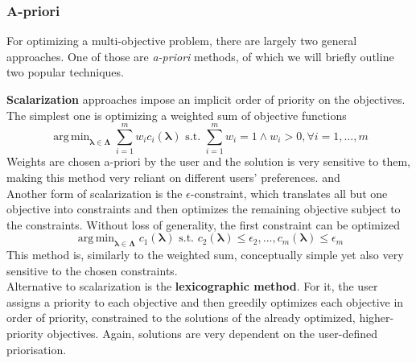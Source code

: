 \documentclass[twoside,11pt]{article}
\DeclareMathOperator*{\argmin}{arg\,min}
\begin{document}
\subsubsection{A-priori}
For optimizing a multi-objective problem, there are largely two general approaches.
One of those are \textit{a-priori} methods, of which we will briefly outline two popular techniques.

\textbf{Scalarization} approaches impose an implicit order of priority on the objectives.
The simplest one is optimizing a weighted sum of objective functions
\begin{equation}
  \argmin_{\boldsymbol\lambda\in\boldsymbol\Lambda} \sum_{i=1}^m w_i c_i(\boldsymbol\lambda)
  \text{ s.t. } \sum_{i=1}^m w_i=1 \wedge w_i>0,\forall i=1,...,m
  \label{eq-a-priori-scalarization-weighted-sum}
\end{equation}
Weights are chosen a-priori by the user and the solution is very sensitive to them, making this method very reliant on different
users' preferences. \citep[p. 11]{10.1145/3610536} and \citep[chap. 3.1]{NSGA}
\\
Another form of scalarization is the $\epsilon$-constraint, which translates all but one objective into constraints and then optimizes the remaining
objective subject to the constraints. Without loss of generality, the first constraint can be optimized
\begin{equation}
  \argmin_{\boldsymbol\lambda\in\boldsymbol\Lambda} c_1(\boldsymbol\lambda)
  \text{ s.t. } c_2(\boldsymbol\lambda)\le\epsilon_2,...,c_m(\boldsymbol\lambda)\le\epsilon_m
  \label{eq-a-priori-scalarization-epsilon}
\end{equation}
This method is, similarly to the weighted sum, conceptually simple yet also very sensitive to the chosen constraints. \citep[p. 12]{10.1145/3610536}
\\
Alternative to scalarization is the \textbf{lexicographic method}.
For it, the user assigns a priority to each objective and then greedily optimizes each objective in order of priority, constrained to the solutions of
the already optimized, higher-priority objectives. \citep[p. 13749]{lexicographic_MOO}
Again, solutions are very dependent on the user-defined priorisation.
\end{document}
